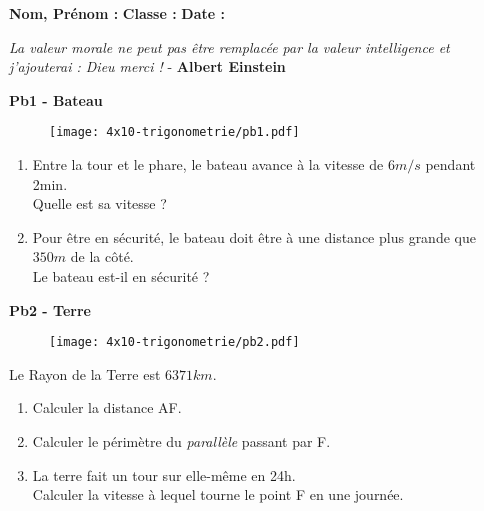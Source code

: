



\textbf{Nom, Prénom :} \hspace{8cm} \textbf{Classe :} \hspace{3cm} \textbf{Date :}\\

\vspace{-0.5cm} \begin{center}
  \textit{La valeur morale ne peut pas être remplacée par la valeur intelligence et j'ajouterai : Dieu merci !}  - \textbf{Albert Einstein}
\end{center}

\begin{multicols}{2}

\textbf{Pb1 - Bateau}

\begin{figure}[H]
  \centering
  \texttt{[image: 4x10-trigonometrie/pb1.pdf]}
\end{figure}

\begin{enumerate}
  \item Entre la tour et le phare, le bateau avance à la vitesse de $6m/s$ pendant 2min. \\
  Quelle est sa vitesse ?
  \item Pour être en sécurité, le bateau doit être à une distance plus grande que $350m$ de la côté. \\
  Le bateau est-il en sécurité ?
\end{enumerate} \columnbreak

\Pointilles[17]

\end{multicols}

\textbf{Pb2 - Terre}

\begin{multicols}{2}

  \begin{figure}[H]
    \centering
    \texttt{[image: 4x10-trigonometrie/pb2.pdf]}
  \end{figure}
  
  Le Rayon de la Terre est $6 371 km$. 
  \begin{enumerate}
    \item Calculer la distance AF.
    \item Calculer le périmètre du \textit{parallèle} passant par F.
    \item La terre fait un tour sur elle-même en 24h. \\
    Calculer la vitesse à lequel tourne le point F en une journée.
  \end{enumerate} \columnbreak

  \Pointilles[18]

\end{multicols}

\Pointilles[8]



